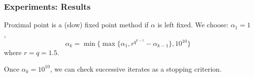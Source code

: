 \documentclass[aspectratio=169,xcolor=dvipsnames,11pt]{beamer}
\begin{document}
 \appendix
 
 \begin{frame}\frametitle{Experiments: Results}
 \hypertarget{target_alpha}{}  %
\begin{minipage}{0.4\linewidth}
\begin{figure}
	\centering
\end{figure}
\end{minipage}\qquad
\begin{minipage}{0.45\linewidth}
{\footnotesize
Proximal point is a (slow) fixed point method if $\alpha$ is left fixed. We choose:  $\alpha_1 = 1$,
\begin{equation*}
\label{eq:ObstacleStepSizes_superexponential}
	\alpha_k
	=
	\min\bigl\{ \max\bigl\{\alpha_1,r^{q^{k-1}} - \alpha_{k-1}\bigr\} , 10^{10} \bigr\}
\end{equation*}
where $r = q = 1.5$.\smallskip  

Once $\alpha_k = 10^{10}$, we can check successive iterates as a stopping criterion.
}
\end{minipage}

    \hyperlink{example_1_alpha}{}
\end{frame}
\end{document}
